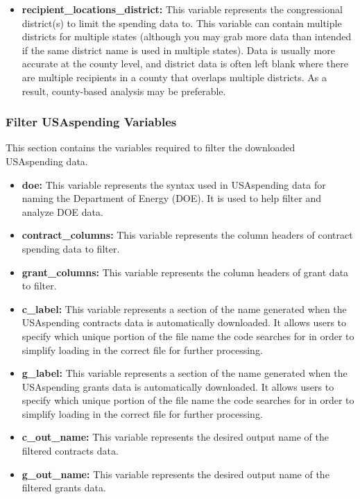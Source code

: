 \documentclass[
]{book}
\providecommand{\tightlist}{%
  \setlength{\itemsep}{0pt}\setlength{\parskip}{0pt}}
\begin{document}
\begin{itemize}
\item
  \textbf{recipient\_locations\_district:} This variable represents the congressional district(s) to limit the spending data to. This variable can contain multiple districts for multiple states (although you may grab more data than intended if the same district name is used in multiple states). Data is usually more accurate at the county level, and district data is often left blank where there are multiple recipients in a county that overlaps multiple districts. As a result, county-based analysis may be preferable.
\end{itemize}

\hypertarget{filter}{%
\subsubsection{Filter USAspending Variables}\label{filter}}

This section contains the variables required to filter the downloaded USAspending data.

\begin{itemize}
\tightlist
\item
  \textbf{doe:} This variable represents the syntax used in USAspending data for naming the Department of Energy (DOE). It is used to help filter and analyze DOE data.\\
\item
  \textbf{contract\_columns:} This variable represents the column headers of contract spending data to filter.
\item
  \textbf{grant\_columns:} This variable represents the column headers of grant data to filter.
\item
  \textbf{c\_label:} This variable represents a section of the name generated when the USAspending contracts data is automatically downloaded. It allows users to specify which unique portion of the file name the code searches for in order to simplify loading in the correct file for further processing.
\item
  \textbf{g\_label:} This variable represents a section of the name generated when the USAspending grants data is automatically downloaded. It allows users to specify which unique portion of the file name the code searches for in order to simplify loading in the correct file for further processing.
\item
  \textbf{c\_out\_name:} This variable represents the desired output name of the filtered contracts data.
\item
  \textbf{g\_out\_name:} This variable represents the desired output name of the filtered grants data.
\end{itemize}
\end{document}
